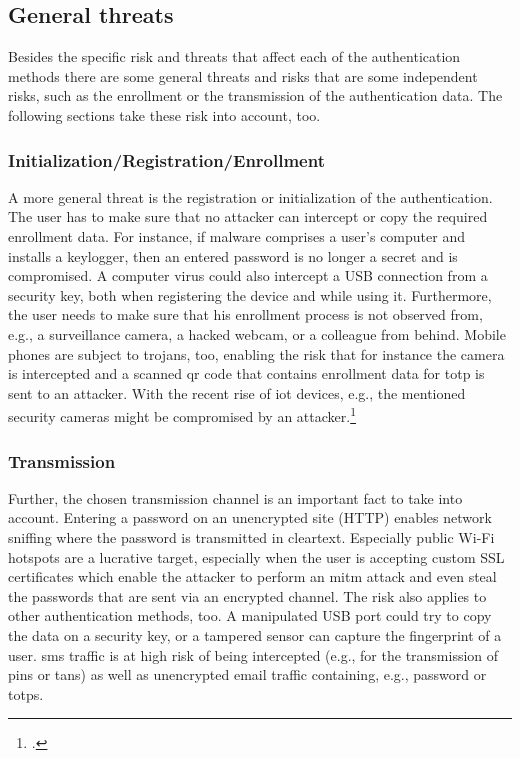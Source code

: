 \subsection{General threats}

Besides the specific risk and threats that affect each of the authentication methods there are some general threats and risks that are some independent risks, such as the enrollment or the transmission of the authentication data. The following sections take these risk into account, too.

\subsubsection{Initialization/Registration/Enrollment}

A more general threat is the registration or initialization of the authentication. The user has to make sure that no attacker can intercept or copy the required enrollment data. For instance, if malware comprises a user’s computer and installs a keylogger, then an entered password is no longer a secret and is compromised. A computer virus could also intercept a USB connection from a security key, both when registering the device and while using it. Furthermore, the user needs to make sure that his enrollment process is not observed from, e.g., a surveillance camera, a hacked webcam, or a colleague from behind. Mobile phones are subject to trojans, too, enabling the risk that for instance the camera is intercepted and a scanned \gls{qr} code that contains enrollment data for \gls{totp} is sent to an attacker. With the recent rise of \gls{iot} devices, e.g., the mentioned security cameras might be compromised by an attacker.\footcites[See][152--153]{10.1007/978-3-642-39235-1_9}[See][61]{Ulqinaku:2019:FPP:3317549.3323404}[See][371--375]{10.1007/978-3-662-45472-5_24}

\subsubsection{Transmission}

Further, the chosen transmission channel is an important fact to take into account. Entering a password on an unencrypted site (HTTP) enables network sniffing where the password is transmitted in cleartext. Especially public Wi-Fi hotspots are a lucrative target, especially when the user is accepting custom SSL certificates which enable the attacker to perform an \gls{mitm} attack and even steal the passwords that are sent via an encrypted channel. The risk also applies to other authentication methods, too. A manipulated USB port could try to copy the data on a security key, or a tampered sensor can capture the fingerprint of a user. \gls{sms} traffic is at high risk of being intercepted (e.g., for the transmission of \glspl{pin} or \glspl{tan}) as well as unencrypted email traffic containing, e.g., password or \glspl{totp}.
